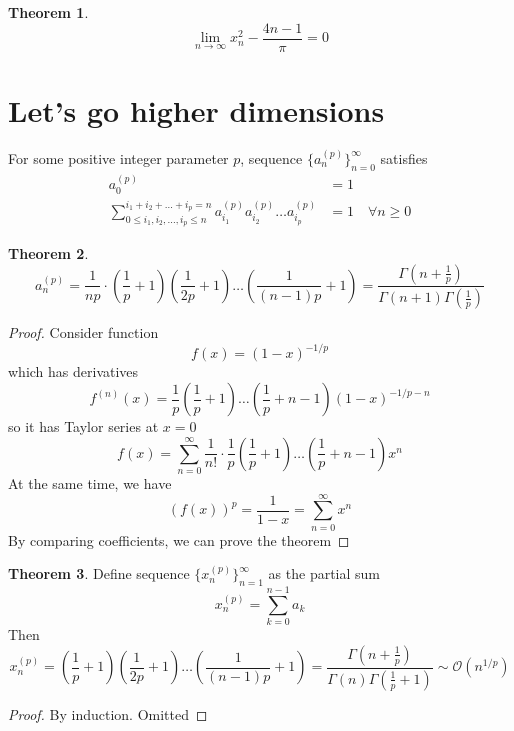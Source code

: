 \documentclass[]{article}
\theoremstyle{definition}\newtheorem{theorem}{Theorem}
\theoremstyle{definition}\newtheorem{lemma}{Lemma}
\begin{document}
\begin{theorem}
\[
\lim_{n\to\infty}x_n^2 - \frac{4n-1}{\pi} = 0
\]
\end{theorem}

\section{Let's go higher dimensions}

For some positive integer parameter $p$, sequence $\{a_n^{(p)}\}_{n=0}^{\infty}$ satisfies
\begin{align*}
	a_0^{(p)} &= 1\\
	\sum_{0\le i_1,i_2,\dots,i_p\le n}^{i_1+i_2+\dots+i_p=n} a_{i_1}^{(p)}a_{i_2}^{(p)}\dots a_{i_p}^{(p)} &= 1 \quad \forall n \ge 0
\end{align*}

\begin{theorem}
	\[
	a_{n}^{(p)} = \frac{1}{np}\cdot\left(\frac{1}{p} + 1\right)\left(\frac{1}{2p} + 1\right)\dots\left(\frac{1}{(n -1)p} + 1\right) = \frac{\Gamma\left(n + \frac{1}{p}\right)}{\Gamma(n+1)\Gamma\left(\frac{1}{p}\right)}
	\]
\end{theorem}
\begin{proof}
	Consider function 
	\[
	f(x) = (1-x)^{-1/p}
	\]
	which has derivatives
	\[
	f^{(n)}(x) = \frac{1}{p}\left(\frac{1}{p} + 1 \right)\dots\left(\frac{1}{p} + n -1\right)(1-x)^{-1/p-n}
	\]
	so it has Taylor series at $x=0$
	\[
	f(x) = \sum_{n=0}^{\infty} \frac{1}{n!}\cdot\frac{1}{p}\left(\frac{1}{p} + 1 \right)\dots\left(\frac{1}{p} + n -1\right) x^n
	\]
	At the same time, we have
	\[
	(f(x))^p = \frac{1}{1-x} = \sum_{n=0}^{\infty}x^n
	\]
	By comparing coefficients, we can prove the theorem
\end{proof}

\begin{theorem}
	Define sequence $\{x_n^{(p)}\}_{n=1}^{\infty}$ as the partial sum
	\[
	x_n^{(p)} = \sum_{k=0}^{n-1} a_k
	\]
	Then
	\[
	x_n^{(p)} = \left(\frac{1}{p} + 1\right)\left(\frac{1}{2p} + 1\right)\dots\left(\frac{1}{(n-1)p} + 1\right) = \frac{\Gamma\left(n + \frac{1}{p}\right)}{\Gamma(n)\Gamma\left(\frac{1}{p} + 1\right)} \sim \mathcal{O}(n^{1/p})
	\]
\end{theorem}
\begin{proof}
	By induction. Omitted
\end{proof}
\end{document}
